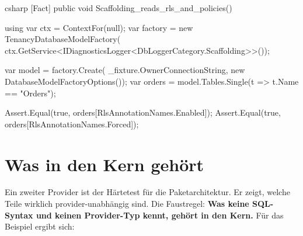 \begin{sourcecode}{csharp}
[Fact]
public void Scaffolding_reads_rls_and_policies()
{
    using var ctx = ContextFor(null);
    var factory = new TenancyDatabaseModelFactory(
        ctx.GetService<IDiagnosticsLogger<DbLoggerCategory.Scaffolding>>());

    var model = factory.Create(
        _fixture.OwnerConnectionString, new DatabaseModelFactoryOptions());
    var orders = model.Tables.Single(t => t.Name == "Orders");

    Assert.Equal(true, orders[RlsAnnotationNames.Enabled]);
    Assert.Equal(true, orders[RlsAnnotationNames.Forced]);
}
\end{sourcecode}

\chapter{Was in den Kern gehört}\label{ch:what-belongs-in-the-core}

Ein zweiter Provider ist der Härtetest für die Paketarchitektur. Er zeigt, welche Teile
wirklich provider-unabhängig sind. Die Faustregel: \textbf{Was keine SQL-Syntax und keinen
Provider-Typ kennt, gehört in den Kern.} Für das Beispiel ergibt sich:

